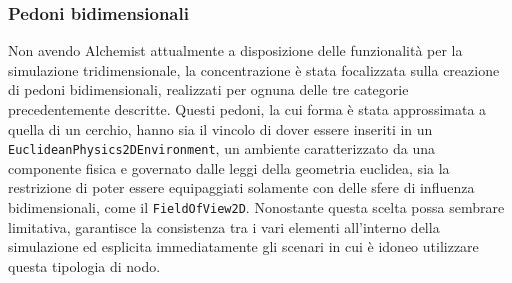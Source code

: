 \subsubsection{Pedoni bidimensionali}
Non avendo Alchemist attualmente a disposizione delle funzionalità per la simulazione tridimensionale, la concentrazione è stata focalizzata sulla creazione di pedoni bidimensionali, realizzati per ognuna delle tre categorie precedentemente descritte. \newline
Questi pedoni, la cui forma è stata approssimata a quella di un cerchio, hanno sia il vincolo di dover essere inseriti in un \texttt{EuclideanPhysics2DEnvironment}, un ambiente caratterizzato da una componente fisica e governato dalle leggi della geometria euclidea, sia la restrizione di poter essere equipaggiati solamente con delle sfere di influenza bidimensionali, come il \texttt{FieldOfView2D}. \newline
Nonostante questa scelta possa sembrare limitativa, garantisce la consistenza tra i vari elementi all'interno della simulazione ed esplicita immediatamente gli scenari in cui è idoneo utilizzare questa tipologia di nodo.


